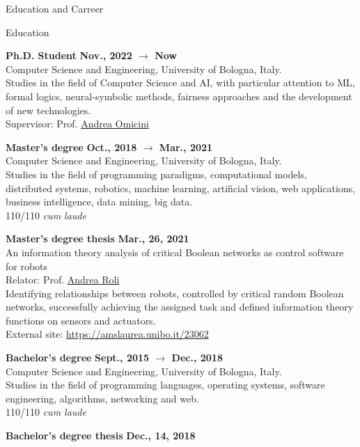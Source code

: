 \documentclass{resume} %
\begin{document}
\begin{rSection}{Education and Carreer}
\begin{rSubsection2}{Education}
            \item\textbf{ Ph.D. Student }\hfill \textbf{Nov., 2022 $\rightarrow$ Now}
            \\Computer Science and Engineering, University of Bologna, Italy.
            \\Studies in the field of Computer Science and AI, with particular attention to ML, formal logics, neural-symbolic methods, fairness approaches and the development of new technologies.
            \\Supervisor: Prof. \href{mailto:andrea.omicini@unibo.it}{Andrea Omicini}
            \item\textbf{ Master's degree }\hfill \textbf{Oct., 2018 $\rightarrow$ Mar., 2021}
            \\Computer Science and Engineering, University of Bologna, Italy.
            \\Studies in the field of programming paradigms, computational models, distributed systems, robotics, machine learning, artificial vision, web applications, business intelligence, data mining, big data.
            \\110/110 \emph{cum laude}
            \item\textbf{ Master's degree thesis }\hfill \textbf{Mar., 26, 2021}
            \\An information theory analysis of critical Boolean networks as control software for robots
            \\Relator: Prof. \href{mailto:andrea.roli@unibo.it}{Andrea Roli}
            \\Identifying relationships between robots, controlled by critical random Boolean networks, successfully achieving the assigned task and defined information theory functions on sensors and actuators.
            \\External site: \url{https://amslaurea.unibo.it/23062}
            \item\textbf{ Bachelor's degree }\hfill \textbf{Sept., 2015 $\rightarrow$ Dec., 2018}
            \\Computer Science and Engineering, University of Bologna, Italy.
            \\Studies in the field of programming languages, operating systems, software engineering, algorithms, networking and web.
            \\110/110 \emph{cum laude}
            \item\textbf{ Bachelor's degree thesis }\hfill \textbf{Dec., 14, 2018}

\end{rSubsection2}
\end{rSection}
\end{document}
